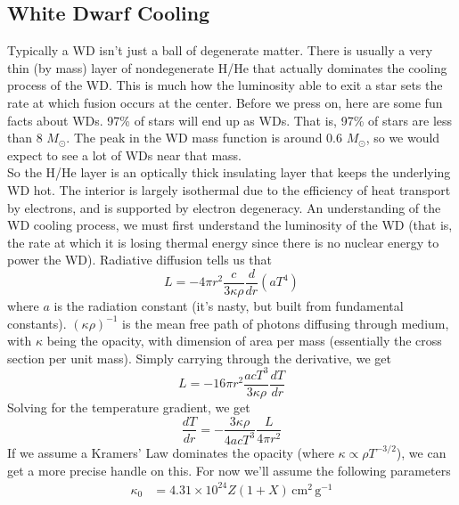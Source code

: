 \documentclass[10pt]{article}
\numberwithin{equation}{section}
\newcommand{\n}{\noindent}
\begin{document}
	\subsection{White Dwarf Cooling} %
	\label{sub:white_dwarf_cooling}
	Typically a WD isn't just a ball of degenerate matter. There is usually a very thin (by mass) layer of nondegenerate H/He that actually dominates the cooling process of the WD. This is much how the luminosity able to exit a star sets the rate at which fusion occurs at the center. Before we press on, here are some fun facts about WDs. 97\% of stars will end up as WDs. That is, 97\% of stars are less than 8 $M_\odot$. The peak in the WD mass function is around 0.6 $M_\odot$, so we would expect to see a lot of WDs near that mass.\\
	
	\n So the H/He layer is an optically thick insulating layer that keeps the underlying WD hot. The interior is largely isothermal due to the efficiency of heat transport by electrons, and is supported by electron degeneracy. An understanding of the WD cooling process, we must first understand the luminosity of the WD (that is, the rate at which it is losing thermal energy since there is no nuclear energy to power the WD). Radiative diffusion tells us that
	\begin{equation}
		\label{eq:cooling:1} L = -4\pi r^2 \frac{c}{3\kappa\rho} \frac{d}{dr}\left(a T^4\right)
	\end{equation}
	where $a$ is the radiation constant (it's nasty, but built from fundamental constants). $(\kappa \rho)^{-1}$ is the mean free path of photons diffusing through medium, with $\kappa$ being the opacity, with dimension of area per mass (essentially the cross section per unit mass).  Simply carrying through the derivative, we get
	\begin{equation}
		\label{eq:cooling:2} L = -16\pi r^2 \frac{acT^3}{3\kappa\rho}\frac{dT}{dr}
	\end{equation}
	Solving for the temperature gradient, we get
	\begin{equation}
		\label{eq:cooling:3} \frac{dT}{dr} = -\frac{3\kappa \rho}{4acT^3}\frac{L}{4\pi r^2}
	\end{equation}
	If we assume a Kramers' Law dominates the opacity (where $\kappa \propto \rho T^{-3/2}$), we can get a more precise handle on this. For now we'll assume the following parameters
	\begin{align}
		\label{eq:cooling:4} \kappa_0 &= 4.31\times 10^{24} Z(1+X)\,\mathrm{cm^2\,g^{-1}}\\
	\end{align}
\end{document}
